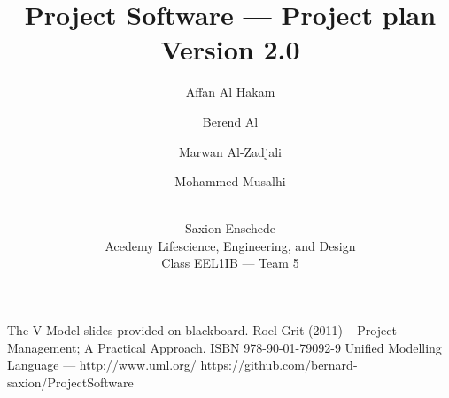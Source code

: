 \documentclass[oneside,a4paper,11pt,titlepage,openany]{report}
\author{
Affan Al Hakam \and 
Berend Al \and
Marwan Al-Zadjali \and
Mohammed Musalhi \and
\\
Saxion Enschede \\
Acedemy Lifescience, Engineering, and Design \\
Class EEL1IB --- Team 5
}
\title{Project Software --- Project plan\\\normalsize Version 2.0}
\begin{document}
\maketitle
\tableofcontents
\listoffigures
\listoftables











\begin{thebibliography}{99}
The V-Model slides provided on blackboard.
Roel Grit (2011) -- Project Management; A Practical Approach. ISBN 978-90-01-79092-9
Unified Modelling Language --- http://www.uml.org/
https://github.com/bernard-saxion/ProjectSoftware
\end{thebibliography}
\end{document}
